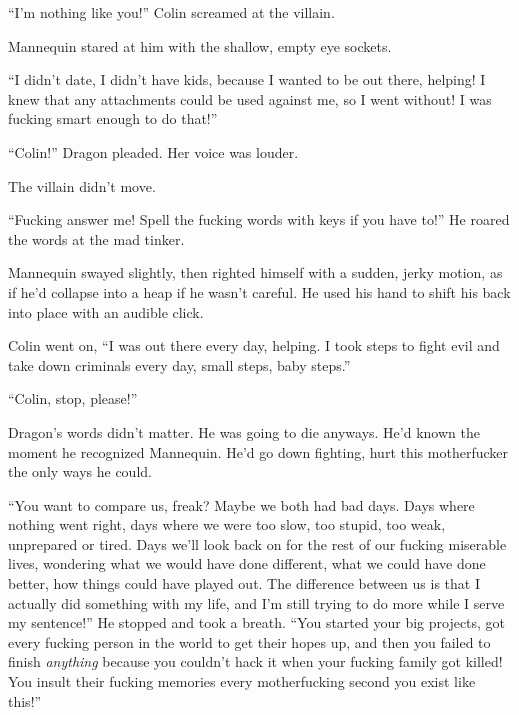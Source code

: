 ``I'm nothing like you!''  Colin screamed at the villain.



Mannequin stared at him with the shallow, empty eye sockets.



``I didn't date, I didn't have kids, because I wanted to be out there, helping!  I knew that any attachments could be used against me, so I went without!  I was fucking smart enough to do that!''



``Colin!''  Dragon pleaded.  Her voice was louder.



The villain didn't move.



``Fucking answer me!  Spell the fucking words with keys if you have to!''  He roared the words at the mad tinker.



Mannequin swayed slightly, then righted himself with a sudden, jerky motion, as if he'd collapse into a heap if he wasn't careful.  He used his hand to shift his back into place with an audible click.



Colin went on, ``I was out there every day, helping.  I took steps to fight evil and take down criminals every day, small steps, baby steps.''



``Colin, stop, please!''



Dragon's words didn't matter.  He was going to die anyways.  He'd known the moment he recognized Mannequin.  He'd go down fighting, hurt this motherfucker the only ways he could.



``You want to compare us, freak?  Maybe we both had bad days.  Days where nothing went right, days where we were too slow, too stupid, too weak, unprepared or tired.  Days we'll look back on for the rest of our fucking miserable lives, wondering what we would have done different, what we could have done better, how things could have played out.  The difference between us is that I actually did something with my life, and I'm still trying to do more while I serve my sentence!''  He stopped and took a breath.  ``You started your big projects, got every fucking person in the world to get their hopes up, and then you failed to finish \emph{anything} because you couldn't hack it when your fucking family got killed!  You insult their fucking memories every motherfucking second you exist like this!''



